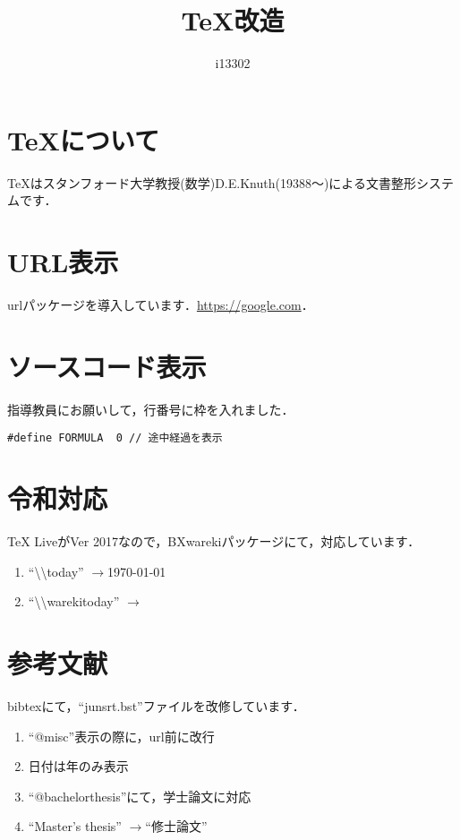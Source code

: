 \documentclass[twocolumn,10pt]{jreport}
\title{\TeX 改造}
\author{i13302}
\date{\warekitoday}
\newcommand{\zr}{$\rightarrow$}
\begin{document}
 
\maketitle 
\section{\TeX について}
TeXはスタンフォード大学教授(数学)D.E.Knuth(19388～)による文書整形システムです\cite{TeX入門}．

\section{URL表示}
urlパッケージを導入しています．\url{https://google.com}．

\section{ソースコード表示}
指導教員にお願いして，行番号に枠を入れました．

\begin{lstlisting}[caption=FORMURAの定義]
#define FORMULA  0 // 途中経過を表示
\end{lstlisting}



\section{令和対応}
TeX LiveがVer 2017なので，BXwarekiパッケージ\cite{bxwareki}にて，対応しています．

\begin{enumerate}
	\item ``\textbackslash\textbackslash  today'' \zr \today
	\item ``\textbackslash\textbackslash warekitoday'' \zr \warekitoday
\end{enumerate}

\section{参考文献}
bibtexにて，``junsrt.bst''ファイルを改修しています．
\begin{enumerate}
	\item ``@misc''表示の際に，url前に改行
	\item 日付は年のみ表示
	\item ``@bachelorthesis''にて，学士論文に対応
	\item ``Master's thesis'' \zr ``修士論文''
\end{enumerate}





\end{document}
